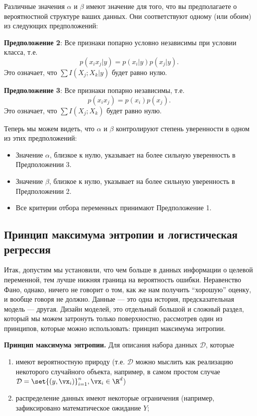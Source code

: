Различные значения $\alpha$ и $\beta$ имеют значение для того, что вы предполагаете о вероятностной структуре ваших данных. Они соответствуют одному (или обоим) из следующих предположений:

	\textbf{Предположение 2}: Все признаки попарно условно независимы при условии класса, т.е.
	$$ p(x_i x_j | y) = p(x_i | y) p(x_j | y). $$
	Это означает, что $\sum I(X_j; X_k | y)$ будет равно нулю.

	\textbf{Предположение 3}: Все признаки попарно независимы, т.е.
	$$ p(x_i x_j) = p(x_i) p(x_j). $$
	Это означает, что $\sum I(X_j; X_k)$ будет равно нулю.

Теперь мы можем видеть, что $\alpha$ и $\beta$ контролируют степень уверенности в одном из этих предположений:

\begin{itemize}
	\item Значение $\alpha$, близкое к нулю, указывает на более сильную уверенность в Предположении 3.
	\item Значение $\beta$, близкое к нулю, указывает на более сильную уверенность в Предположении 2.
	\item Все критерии отбора переменных принимают Предположение 1.
\end{itemize}


\subsection{Принцип максимума энтропии и логистическая регрессия}

Итак, допустим мы установили, что чем больше в данных информации о целевой переменной, тем лучше нижняя граница на вероятность ошибки. Неравенство Фано, однако, ничего не говорит о том, как же нам получить \enquote{хорошую} оценку, и вообще говоря не должно. Данные --- это одна история, предсказательная модель --- другая. Дизайн моделей, это отдельный большой и сложный раздел, который мы можем затронуть только поверхностно, рассмотрев один из принципов, которые можно использовать: принцип максимума энтропии.
	
\textbf{Принцип максимума энтропии.} Для описания набора данных $\mathcal{D}$, которые
\begin{enumerate}[compact]
	\item имеют вероятностную природу (т.е. $\mathcal{D}$ можно мыслить как реализацию некоторого случайного объекта, например, в самом простом случае $\mathcal{D} = \set{(y, \vx_i)}_{i = 1}^{n}, \vx_i \in \R^d$)
	\item распределение данных имеют некоторые ограничения (например, зафиксировано математическое ожидание $Y$;
\end{enumerate}





